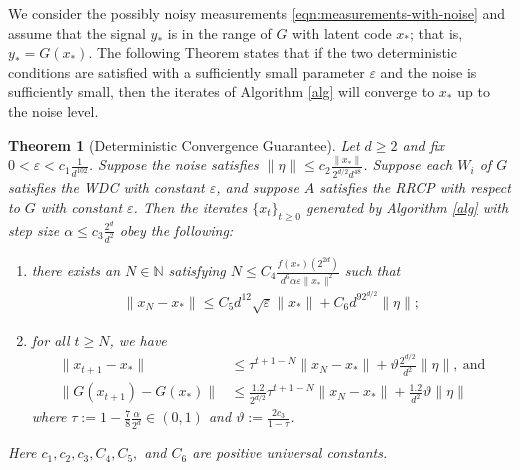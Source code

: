 \documentclass[11pt]{article}
\renewcommand{\epsilon}{\varepsilon}
\newcommand{\N}{\mathbb{N}}
\newcommand{\al}{\alpha}
\newcommand{\G}{G}
\newtheorem{thm}{Theorem}
\theoremstyle{remark}
\begin{document}
We consider the possibly noisy measurements \eqref{eqn:measurements-with-noise} and assume that the signal $y_*$ is in the range of $\G$ with latent code $x_*$; that is, $y_* = \G(x_*)$.
The following Theorem states that if the two deterministic conditions are satisfied with a sufficiently small parameter $\epsilon$ and the noise is sufficiently small, then the iterates of Algorithm \ref{alg} will converge to $x_*$ up to the noise level. 
\begin{thm}[Deterministic Convergence Guarantee] \label{main_deterministic_conv_result}
Let $d \geqslant 2$ and fix $0 < \epsilon < c_1\frac{1}{d^{102}}$. Suppose the noise  satisfies $\|\eta\| \leqslant c_{2}\frac{\|x_*\|}{2^{d/2}d^{48}}$. Suppose each $W_i$ of $\G$ satisfies the WDC with constant $\epsilon$, and suppose $A$ satisfies the RRCP with respect to $\G$ with constant $\epsilon$. Then the iterates $\{x_t\}_{t \geqslant 0}$ generated by Algorithm \ref{alg} with step size $\al \leqslant c_3\frac{2^d}{d^2}$ obey the following: \begin{enumerate}
    \item there exists an $N \in \N$ satisfying $N \leqslant C_4\frac{f(x_*)(2^{2d})}{d^6 \al \epsilon \|x_*\|^2}$ such that \begin{align}
        \|x_N - x_*\| \leqslant C_5 d^{12}\sqrt{\epsilon}\|x_*\| + C_6 d^92^{d/2}\|\eta\|; \label{bound_on_Nth_iterate}
        \end{align}
    \item for all $t \geqslant N$, we have \begin{align}
        \|x_{t+1} - x_*\| & \leqslant \tau^{t+1-N}\|x_N-x_*\| + \vartheta \frac{2^{d/2}}{d^2}\|\eta\|,\ \text{and} \label{final_iterate_bound} \\
        \|\G(x_{t+1}) - \G(x_*) \| & \leqslant \frac{1.2}{2^{d/2}}\tau^{t+1-N}\|x_{N}-x_*\| + \frac{1.2}{d^2}\vartheta \|\eta\| \label{final_output_through_genmodel_bound}
    \end{align} where $\tau := 1 - \frac{7}{8}\frac{\al}{2^d} \in (0,1)$ and $\vartheta := \frac{2c_3}{1-\tau}$.
\end{enumerate} Here $c_1, c_2, c_3, C_4, C_5,$ and $C_6$ are positive universal constants.
\end{thm} 
\end{document}
